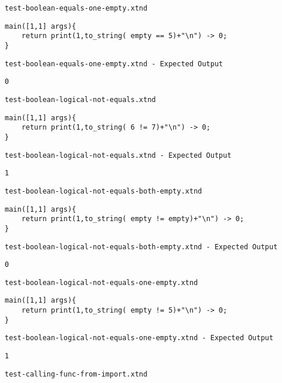\medskip \noindent \texttt{test-boolean-equals-one-empty.xtnd}


\begin{lstlisting}
main([1,1] args){
	return print(1,to_string( empty == 5)+"\n") -> 0;
}
\end{lstlisting}


\medskip \noindent \texttt{test-boolean-equals-one-empty.xtnd - Expected Output}


\begin{lstlisting}
0
\end{lstlisting}


\medskip \noindent \texttt{test-boolean-logical-not-equals.xtnd}


\begin{lstlisting}
main([1,1] args){
	return print(1,to_string( 6 != 7)+"\n") -> 0;
}
\end{lstlisting}


\medskip \noindent \texttt{test-boolean-logical-not-equals.xtnd - Expected Output}


\begin{lstlisting}
1
\end{lstlisting}


\medskip \noindent \texttt{test-boolean-logical-not-equals-both-empty.xtnd}


\begin{lstlisting}
main([1,1] args){
	return print(1,to_string( empty != empty)+"\n") -> 0;
}
\end{lstlisting}


\medskip \noindent \texttt{test-boolean-logical-not-equals-both-empty.xtnd - Expected Output}


\begin{lstlisting}
0
\end{lstlisting}


\medskip \noindent \texttt{test-boolean-logical-not-equals-one-empty.xtnd}


\begin{lstlisting}
main([1,1] args){
	return print(1,to_string( empty != 5)+"\n") -> 0;
}
\end{lstlisting}


\medskip \noindent \texttt{test-boolean-logical-not-equals-one-empty.xtnd - Expected Output}


\begin{lstlisting}
1
\end{lstlisting}


\medskip \noindent \texttt{test-calling-func-from-import.xtnd}


